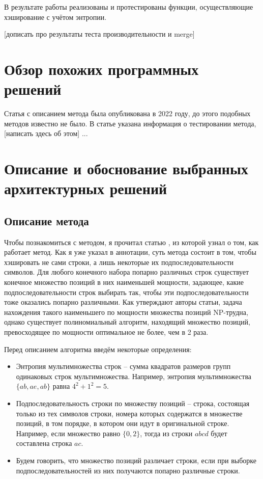 \documentclass[a4paper,12pt]{extarticle}
\begin{document}
В результате работы реализованы и протестированы функции, осуществляющие хэширование с учётом энтропии.

[дописать про результаты теста производительности и merge]

\pagebreak

\section{Обзор похожих программных решений}

Статья с описанием метода \cite{the_paper} была опубликована в 2022 году, до этого подобных методов известно не было. В статье указана информация о тестировании метода, [написать здесь об этом] ...

\newpage

\section{Описание и обоснование выбранных архитектурных решений}
\subsection{Описание метода}
Чтобы познакомиться с методом, я прочитал статью \cite{the_paper}, из которой узнал о том, как работает метод. Как я уже указал в аннотации, суть метода состоит в том, чтобы хэшировать не сами строки, а лишь некоторые их подпоследовательности символов. Для любого конечного набора попарно различных строк существует конечное множество позиций в них наименьшей мощности, задающее, какие подпоследовательности строк выбирать так, чтобы эти подпоследовательности тоже оказались попарно различными. Как утверждают авторы статьи, задача нахождения такого наименьшего по мощности множества позиций NP-трудна, однако существует полиномиальный алгоритм, находящий множество позиций, превосходящее по мощности оптимальное не более, чем в 2 раза.

Перед описанием алгоритма введём некоторые определения:

\begin{itemize}
	\item Энтропия мультимножества строк -- сумма квадратов размеров групп одинаковых строк мультимножества. Например, энтропия мультимножества $\{ab, ae, ab\}$ равна $4^2+1^2 = 5$.
	\item Подпоследовательность строки по множеству позиций -- строка, состоящая только из тех символов строки, номера которых содержатся в множестве позиций, в том порядке, в котором они идут в оригинальной строке. Например, если множество равно $\{0, 2\}$, тогда из строки $abcd$ будет составлена строка $ac$.
	\item Будем говорить, что множество позиций различает строки, если при выборке подпоследовательностей из них получаются попарно различные строки.
\end{itemize}
\end{document}
